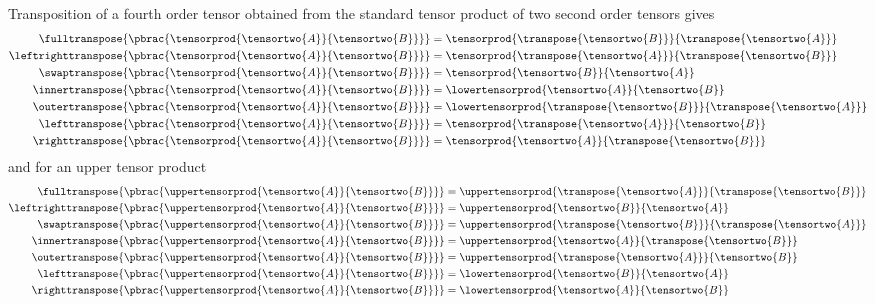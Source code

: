 Transposition of a fourth order tensor obtained from the standard tensor
product of two second order tensors gives
\begin{align}
  \fulltranspose{\pbrac{\tensorprod{\tensortwo{A}}{\tensortwo{B}}}}&=\tensorprod{\transpose{\tensortwo{B}}}{\transpose{\tensortwo{A}}} \label{eqn:FullTransposeProductTwoTwoTensor} \\
  \leftrighttranspose{\pbrac{\tensorprod{\tensortwo{A}}{\tensortwo{B}}}}&=\tensorprod{\transpose{\tensortwo{A}}}{\transpose{\tensortwo{B}}} \label{eqn:LeftRightTransposeProductTwoTwoTensor} \\
  \swaptranspose{\pbrac{\tensorprod{\tensortwo{A}}{\tensortwo{B}}}}&=\tensorprod{\tensortwo{B}}{\tensortwo{A}} \label{eqn:SwapTransposeProductTwoTwoTensor} \\
  \innertranspose{\pbrac{\tensorprod{\tensortwo{A}}{\tensortwo{B}}}}&=\lowertensorprod{\tensortwo{A}}{\tensortwo{B}}  \label{eqn:InnerTransposeProductTwoTwoTensor} \\
  \outertranspose{\pbrac{\tensorprod{\tensortwo{A}}{\tensortwo{B}}}}&=\lowertensorprod{\transpose{\tensortwo{B}}}{\transpose{\tensortwo{A}}}  \label{eqn:OuterTransposeProductTwoTwoTensor} \\
  \lefttranspose{\pbrac{\tensorprod{\tensortwo{A}}{\tensortwo{B}}}}&=\tensorprod{\transpose{\tensortwo{A}}}{\tensortwo{B}}  \label{eqn:LeftTransposeProductTwoTwoTensor} \\
  \righttranspose{\pbrac{\tensorprod{\tensortwo{A}}{\tensortwo{B}}}}&=\tensorprod{\tensortwo{A}}{\transpose{\tensortwo{B}}}  \label{eqn:RightTransposeProductTwoTwoTensor} 
\end{align}
and for an upper tensor product
\begin{align}
  \fulltranspose{\pbrac{\uppertensorprod{\tensortwo{A}}{\tensortwo{B}}}}&=\uppertensorprod{\transpose{\tensortwo{A}}}{\transpose{\tensortwo{B}}}  \label{eqn:FullTransposeUpperProductTwoTwoTensor} \\
  \leftrighttranspose{\pbrac{\uppertensorprod{\tensortwo{A}}{\tensortwo{B}}}}&=\uppertensorprod{\tensortwo{B}}{\tensortwo{A}}  \label{eqn:LeftRightTransposeUpperProductTwoTwoTensor} \\
  \swaptranspose{\pbrac{\uppertensorprod{\tensortwo{A}}{\tensortwo{B}}}}&=\uppertensorprod{\transpose{\tensortwo{B}}}{\transpose{\tensortwo{A}}} \label{eqn:SwapTransposeUpperProductTwoTwoTensor} \\
  \innertranspose{\pbrac{\uppertensorprod{\tensortwo{A}}{\tensortwo{B}}}}&=\uppertensorprod{\tensortwo{A}}{\transpose{\tensortwo{B}}}  \label{eqn:InnerTransposeUpperProductTwoTwoTensor} \\
  \outertranspose{\pbrac{\uppertensorprod{\tensortwo{A}}{\tensortwo{B}}}}&=\uppertensorprod{\transpose{\tensortwo{A}}}{\tensortwo{B}}  \label{eqn:OuterTransposeUpperProductTwoTwoTensor} \\
  \lefttranspose{\pbrac{\uppertensorprod{\tensortwo{A}}{\tensortwo{B}}}}&=\lowertensorprod{\tensortwo{B}}{\tensortwo{A}}  \label{eqn:LeftTransposeUpperProductTwoTwoTensor} \\
  \righttranspose{\pbrac{\uppertensorprod{\tensortwo{A}}{\tensortwo{B}}}}&=\lowertensorprod{\tensortwo{A}}{\tensortwo{B}}  \label{eqn:RightTransposeUpperProductTwoTwoTensor} 
\end{align}
